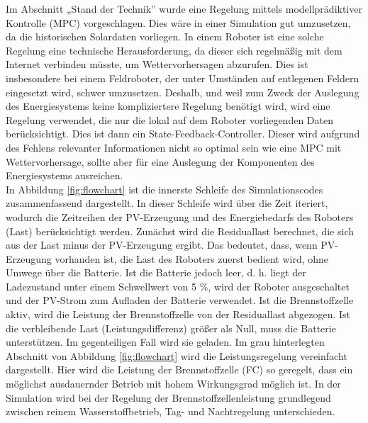 Im Abschnitt „Stand der Technik” wurde eine Regelung mittels modellprädiktiver Kontrolle (MPC) vorgeschlagen. Dies wäre in einer Simulation gut umzusetzen, da die historischen Solardaten vorliegen. In einem Roboter ist eine solche Regelung eine technische Herausforderung, da dieser sich regelmäßig mit dem Internet verbinden müsste, um Wettervorhersagen abzurufen. Dies ist insbesondere bei einem Feldroboter, der unter Umständen auf entlegenen Feldern eingesetzt wird, schwer umzusetzen. Deshalb, und weil zum Zweck der Auslegung des Energiesystems keine kompliziertere Regelung benötigt wird, wird eine Regelung verwendet, die nur die lokal auf dem Roboter vorliegenden Daten berücksichtigt. Dies ist dann ein State-Feedback-Controller. Dieser wird aufgrund des Fehlens relevanter Informationen nicht so optimal sein wie eine MPC mit Wettervorhersage, sollte aber für eine Auslegung der Komponenten des Energiesystems ausreichen. \\

In Abbildung \ref{fig:flowchart} ist die innerste Schleife des Simulationscodes zusammenfassend dargestellt. In dieser Schleife wird über die Zeit iteriert, wodurch die Zeitreihen der PV-Erzeugung und des Energiebedarfs des Roboters (Last) berücksichtigt werden. Zunächst wird die Residuallast berechnet, die sich aus der Last minus der PV-Erzeugung ergibt. Das bedeutet, dass, wenn PV-Erzeugung vorhanden ist, die Last des Roboters zuerst bedient wird, ohne Umwege über die Batterie. Ist die Batterie jedoch leer, d. h. liegt der Ladezustand unter einem Schwellwert von 5 \%, wird der Roboter ausgeschaltet und der PV-Strom zum Aufladen der Batterie verwendet. Ist die Brennstoffzelle aktiv, wird die Leistung der Brennstoffzelle von der Residuallast abgezogen. Ist die verbleibende Last (Leistungsdifferenz) größer als Null, muss die Batterie unterstützen. Im gegenteiligen Fall wird sie geladen. Im grau hinterlegten Abschnitt von Abbildung \ref{fig:flowchart} wird die Leistungsregelung vereinfacht dargestellt. Hier wird die Leistung der Brennstoffzelle (FC) so geregelt, dass ein möglichst ausdauernder Betrieb mit hohem Wirkungsgrad möglich ist. In der Simulation wird bei der Regelung der Brennstoffzellenleistung grundlegend zwischen reinem Wasserstoffbetrieb, Tag- und Nachtregelung unterschieden. 

